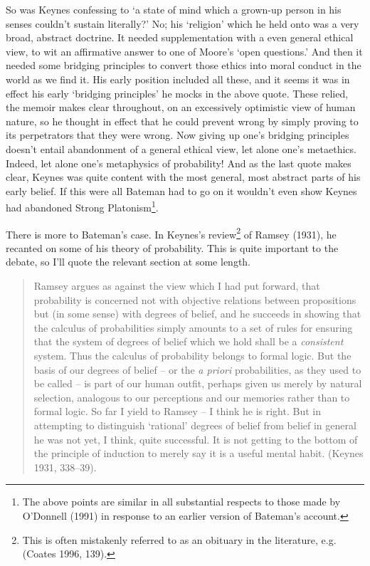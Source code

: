 \documentclass[noflushend]{philosophersimprint}
\begin{document}
So was Keynes confessing to `a state of mind which a grown-up person in
his senses couldn't sustain literally?' No; his `religion' which he held
onto was a very broad, abstract doctrine. It needed supplementation with
a even general ethical view, to wit an affirmative answer to one of
Moore's `open questions.' And then it needed some bridging principles to
convert those ethics into moral conduct in the world as we find it. His
early position included all these, and it seems it was in effect his
early `bridging principles' he mocks in the above quote. These relied,
the memoir makes clear throughout, on an excessively optimistic view of
human nature, so he thought in effect that he could prevent wrong by
simply proving to its perpetrators that they were wrong. Now giving up
one's bridging principles doesn't entail abandonment of a general
ethical view, let alone one's metaethics. Indeed, let alone one's
metaphysics of probability! And as the last quote makes clear, Keynes
was quite content with the most general, most abstract parts of his
early belief. If this were all Bateman had to go on it wouldn't even
show Keynes had abandoned Strong Platonism\footnote{The above points are
  similar in all substantial respects to those made by O'Donnell (1991)
  in response to an earlier version of Bateman's account.}.

There is more to Bateman's case. In Keynes's review\footnote{This is
  often mistakenly referred to as an obituary in the literature, e.g.
  (Coates 1996, 139).} of Ramsey (1931), he recanted on some of his
theory of probability. This is quite important to the debate, so I'll
quote the relevant section at some length.

\begin{quote}
Ramsey argues as against the view which I had put forward, that
probability is concerned not with objective relations between
propositions but (in some sense) with degrees of belief, and he succeeds
in showing that the calculus of probabilities simply amounts to a set of
rules for ensuring that the system of degrees of belief which we hold
shall be a \emph{consistent} system. Thus the calculus of probability
belongs to formal logic. But the basis of our degrees of belief -- or
the \emph{a priori} probabilities, as they used to be called -- is part
of our human outfit, perhaps given us merely by natural selection,
analogous to our perceptions and our memories rather than to formal
logic. So far I yield to Ramsey -- I think he is right. But in
attempting to distinguish `rational' degrees of belief from belief in
general he was not yet, I think, quite successful. It is not getting to
the bottom of the principle of induction to merely say it is a useful
mental habit. (Keynes 1931, 338--39).
\end{quote}
\end{document}
